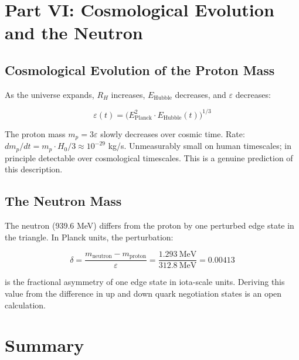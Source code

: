 \documentclass[11pt,letterpaper]{article}
\begin{document}
\section{Part VI: Cosmological Evolution and the Neutron}
\label{sec:orgab92c29}

\subsection{Cosmological Evolution of the Proton Mass}
\label{sec:orgfb6cc7e}

As the universe expands, \(R_H\) increases, \(E_\text{Hubble}\) decreases, and \(\varepsilon\) decreases:

\begin{equation}
\varepsilon(t) = \bigl(E_\text{Planck}^2 \cdot E_\text{Hubble}(t)\bigr)^{1/3}
\end{equation}

The proton mass \(m_p = 3\varepsilon\) slowly decreases over cosmic time. Rate: \(dm_p/dt = m_p \cdot H_0/3 \approx 10^{-29}\) kg/s. Unmeasurably small on human timescales; in principle detectable over cosmological timescales. This is a genuine prediction of this description.

\subsection{The Neutron Mass}
\label{sec:orgc817161}

The neutron (939.6 MeV) differs from the proton by one perturbed edge state in the triangle. In Planck units, the perturbation:

\begin{equation}
\delta = \frac{m_\text{neutron} - m_\text{proton}}{\varepsilon} = \frac{1.293\ \text{MeV}}{312.8\ \text{MeV}} = 0.00413
\end{equation}

is the fractional asymmetry of one edge state in iota-scale units. Deriving this value from the difference in up and down quark negotiation states is an open calculation.

\section{Summary}
\label{sec:org3db995d}
\end{document}
